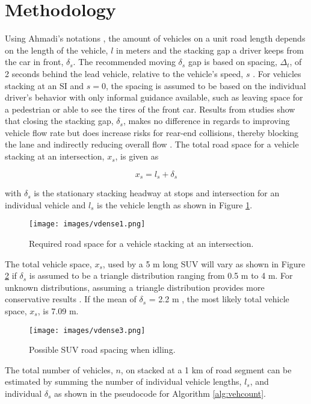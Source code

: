 \section{Methodology}

Using Ahmadi's notations \citep{Ahmadi2017}, the amount of vehicles on a unit road length depends on the length of the vehicle, $l$ in meters and the stacking gap a driver keeps from the car in front, $\delta_{s}$.  The recommended moving $\delta_{s}$ gap is based on spacing, $\Delta_{t}$, of 2 seconds behind the lead vehicle, relative to the vehicle's speed, $s$ \citep{NYDMV2015, ukdot2017}.  For vehicles stacking at an SI and $s=0$, the spacing is assumed to be based on the individual driver's behavior with only informal guidance available, such as leaving space for a pedestrian or able to see the tires of the front car. Results from studies show that closing the stacking gap, $\delta_{s}$, makes no difference in regards to improving vehicle flow rate but does increase risks for rear-end collisions, thereby blocking the lane and indirectly reducing overall flow \citep{Ahmadi2017}. The total road space for a vehicle stacking at an intersection, $x_{s}$, is given as

\begin{equation}
\label{eq:roadspace}
x_{s}= l_{s} +\delta_{s}
\end{equation}

\noindent
with $\delta_{s}$ is the stationary stacking headway at stops and intersection for an individual vehicle and $l_{s}$ is the vehicle length as shown in Figure \ref{fig1:roadspace}.

\begin{figure}[H]
\centering
\texttt{[image: images/vdense1.png]} 
\caption{Required road space for a vehicle stacking at an intersection.}
\label{fig1:roadspace}
\end{figure}
%
The total vehicle space, $x_{s}$, used by a 5 m long SUV will vary as shown in Figure \ref{fig3:SUVspace} if $\delta_{s}$ is assumed to be a triangle distribution ranging from 0.5 m to 4 m. For unknown distributions, assuming a triangle distribution provides more conservative results \citep{Freeman2018}. If  the mean of $\delta_{s}$ = 2.2 m , the most likely total vehicle space, $x_{s}$,  is  7.09 m.
%
\begin{figure}[H]
\centering
\texttt{[image: images/vdense3.png]} 
\caption{Possible SUV road spacing when idling.}
\label{fig3:SUVspace}
\end{figure}
%
The total number of vehicles, $n$, on stacked at a 1 km of road segment can be estimated by summing the number of individual vehicle lengths, $l_{s}$, and individual $\delta_{s}$ as shown in the pseudocode for Algorithm \ref{alg:vehcount}.

